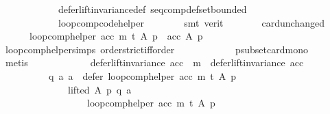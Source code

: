 \begin{isabellebody}
\ \ \ \ \ \ \ \ \ \ \ \ defer{\isacharunderscore}{\kern0pt}lift{\isacharunderscore}{\kern0pt}invariance{\isacharunderscore}{\kern0pt}def\ seq{\isacharunderscore}{\kern0pt}comp{\isacharunderscore}{\kern0pt}def{\isacharunderscore}{\kern0pt}set{\isacharunderscore}{\kern0pt}bounded\isanewline
\ \ \ \ \ \ \ \ \ \ \ \ loop{\isacharunderscore}{\kern0pt}comp{\isacharunderscore}{\kern0pt}code{\isacharunderscore}{\kern0pt}helper\isanewline
\ \ \ \ \ \ \isamarkupfalse%
\ {\isacharparenleft}{\kern0pt}smt\ {\isacharparenleft}{\kern0pt}verit{\isacharparenright}{\kern0pt}{\isacharparenright}{\kern0pt}\isanewline
\ \ \ \ \isamarkupfalse%
\ \isamarkupfalse%
\ card{\isacharunderscore}{\kern0pt}unchanged\ \isamarkupfalse%
\isanewline
\ \ \ \ \ \ {\isachardoublequoteopen}{\isacharparenleft}{\kern0pt}loop{\isacharunderscore}{\kern0pt}comp{\isacharunderscore}{\kern0pt}helper\ acc\ m\ t{\isacharparenright}{\kern0pt}\ A\ p\ {\isacharequal}{\kern0pt}\ acc\ A\ p{\isachardoublequoteclose}\isanewline
\ \ \ \ \ \ \isamarkupfalse%
\ loop{\isacharunderscore}{\kern0pt}comp{\isacharunderscore}{\kern0pt}helper{\isachardot}{\kern0pt}simps{\isacharparenleft}{\kern0pt}{}{\isacharparenright}{\kern0pt}\ order{\isachardot}{\kern0pt}strict{\isacharunderscore}{\kern0pt}iff{\isacharunderscore}{\kern0pt}order\isanewline
\ \ \ \ \ \ \ \ \ \ \ \ psubset{\isacharunderscore}{\kern0pt}card{\isacharunderscore}{\kern0pt}mono\isanewline
\ \ \ \ \ \ \isamarkupfalse%
\ metis\isanewline
\ \ \ \ \isamarkupfalse%
\ \isamarkupfalse%
\isanewline
\ \ \ \ \ \ {\isachardoublequoteopen}{\isacharparenleft}{\kern0pt}defer{\isacharunderscore}{\kern0pt}lift{\isacharunderscore}{\kern0pt}invariance\ {\isacharparenleft}{\kern0pt}acc\ {\isasymtriangleright}\ m{\isacharparenright}{\kern0pt}\ {\isasymand}\ defer{\isacharunderscore}{\kern0pt}lift{\isacharunderscore}{\kern0pt}invariance\ acc{\isacharparenright}{\kern0pt}\ {\isasymlongrightarrow}\isanewline
\ \ \ \ \ \ \ \ \ \ {\isacharparenleft}{\kern0pt}{\isasymforall}q\ a{\isachardot}{\kern0pt}\ {\isacharparenleft}{\kern0pt}a\ {\isasymin}\ {\isacharparenleft}{\kern0pt}defer\ {\isacharparenleft}{\kern0pt}loop{\isacharunderscore}{\kern0pt}comp{\isacharunderscore}{\kern0pt}helper\ acc\ m\ t{\isacharparenright}{\kern0pt}\ A\ p{\isacharparenright}{\kern0pt}\ {\isasymand}\isanewline
\ \ \ \ \ \ \ \ \ \ \ \ \ \ lifted\ A\ p\ q\ a{\isacharparenright}{\kern0pt}\ {\isasymlongrightarrow}\isanewline
\ \ \ \ \ \ \ \ \ \ \ \ \ \ \ \ \ \ {\isacharparenleft}{\kern0pt}loop{\isacharunderscore}{\kern0pt}comp{\isacharunderscore}{\kern0pt}helper\ acc\ m\ t{\isacharparenright}{\kern0pt}\ A\ p\ {\isacharequal}{\kern0pt}\isanewline

\end{isabellebody}
